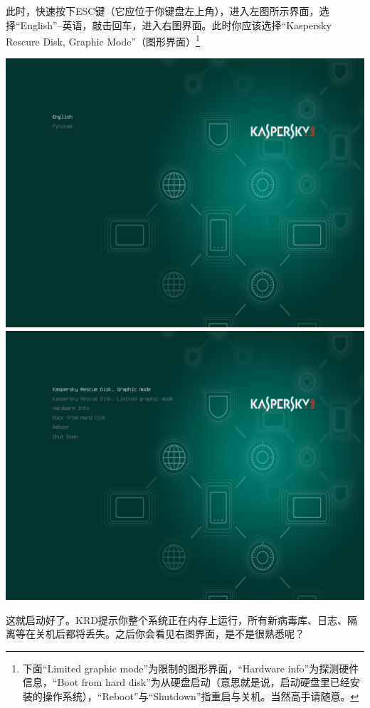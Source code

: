\documentclass{book}
\begin{document}
此时，快速按下ESC键（它应位于你键盘左上角），进入左图所示界面，选择“English”--英语，敲击回车，进入右图界面。此时你应该选择“Kaspersky Rescure Disk, Graphic Mode”（图形界面）\footnote{下面“Limited graphic mode”为限制的图形界面，“Hardware info”为探测硬件信息，“Boot from hard disk”为从硬盘启动（意思就是说，启动硬盘里已经安装的操作系统），“Reboot”与“Shutdown”指重启与关机。当然高手请随意。}
\begin{center}
	\includegraphics[scale=0.25]{pic/krd2}	\includegraphics[scale=0.25]{pic/krd3}
\end{center}
这就启动好了。KRD提示你整个系统正在内存上运行，所有新病毒库、日志、隔离等在关机后都将丢失。之后你会看见右图界面，是不是很熟悉呢？
\end{document}
